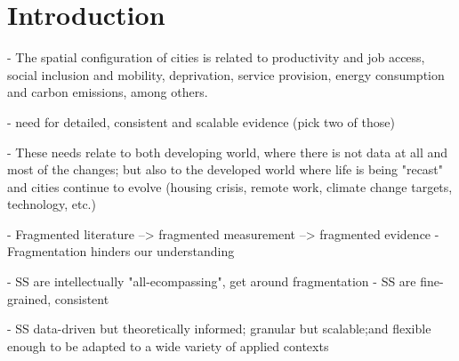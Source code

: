 \section{Introduction}
\label{sec:intro}











- The spatial configuration of cities is related to productivity and job
  access, social inclusion and mobility, deprivation, service provision,
  energy consumption and carbon emissions, among others.

- need for detailed, consistent and scalable evidence (pick two of those)

- These needs relate to both developing world, where there is not data at all
  and most of the changes; but also to the developed world where life is being
  "recast" and cities continue to evolve (housing crisis, remote work, climate
  change targets, technology, etc.)

- Fragmented literature --> fragmented measurement --> fragmented evidence
- Fragmentation hinders our understanding

- SS are intellectually "all-ecompassing", get around fragmentation
- SS are fine-grained, consistent

- SS data-driven but theoretically informed; granular but scalable;and flexible enough to be adapted to a wide variety of applied contexts
